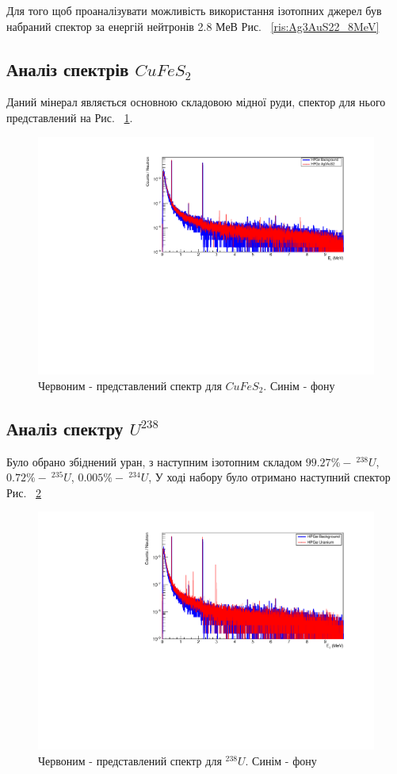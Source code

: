 \documentclass[a4paper, 14pt]{article}
\numberwithin{equation}{section}
\numberwithin{table}{section}
\begin{document}
Для того щоб проаналізувати можливість використання ізотопних джерел був набраний спектор за енергій нейтронів 2.8 МеВ Рис. ~\ref{ris:Ag3AuS22_8MeV}
\newpage
\subsection{Аналіз спектрів $CuFeS_2$}
Даний мінерал являється основною складовою мідної руди, спектор для нього представлений на Рис. ~\ref{ris:CuFeS_2Fon}.
\begin{figure}[hbt!]
	\centering \includegraphics[width=1\textwidth]{res/smCuFeS2FonAll.pdf}
	\caption{Червоним - представлений спектр для $CuFeS_2$. Синім - фону} 
	\label{ris:CuFeS_2Fon}	
\end{figure}

\newpage
\subsection{Аналіз спектру $U^{238}$}
Було обрано збіднений уран, з наступним ізотопним складом $99.27\% -\  ^{238}U$, $ 0.72\% - \  ^{235}U$, $ 0.005\% - \ ^{234}U$, У ході набору було отримано наступний спектор Рис. ~\ref{ris:poorU}
\begin{figure}[hbt!]
	\centering \includegraphics[width=1\textwidth]{res/poorUranium.pdf}
	\caption{Червоним - представлений спектр для $^{238}U$. Синім - фону} 
	\label{ris:poorU}	
\end{figure} 	
\end{document}
